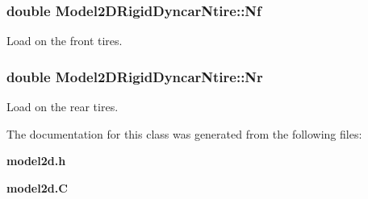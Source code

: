 \subsubsection{\setlength{\rightskip}{0pt plus 5cm}double Model2DRigid\-Dyncar\-Ntire::Nf}\label{classModel2DRigidDyncarNtire_m1}


Load on the front tires.

\subsubsection{\setlength{\rightskip}{0pt plus 5cm}double Model2DRigid\-Dyncar\-Ntire::Nr}\label{classModel2DRigidDyncarNtire_m2}


Load on the rear tires.



The documentation for this class was generated from the following files:\begin{CompactItemize}
\item 
{\bf model2d.h}\item 
{\bf model2d.C}\end{CompactItemize}
